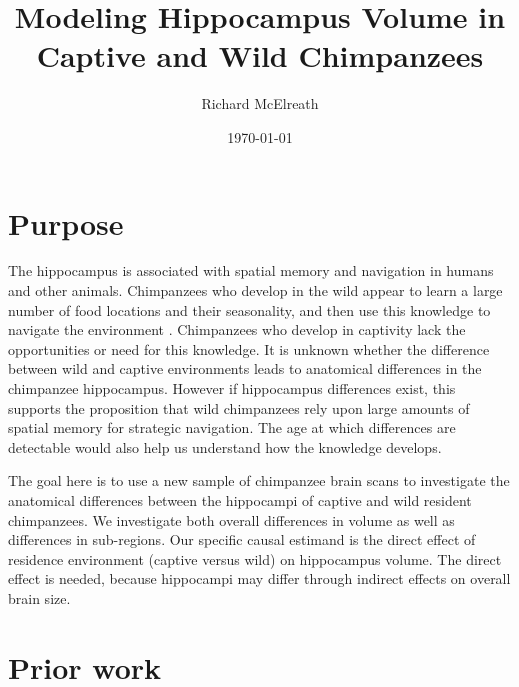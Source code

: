 \documentclass[reqno ,11pt]{amsart}
\begin{document}
\title[Hippocampus Volume]{\large Modeling Hippocampus Volume in Captive and Wild Chimpanzees}
\author{Richard McElreath}
\address{Department of Human Behavior, Ecology and Culture, Max Planck Institute for Evolutionary Anthropology, Deutscher Platz 6, 04103 Leipzig, Germany}
\date{\today}

\maketitle


\linenumbers
\modulolinenumbers[5]

\section{Purpose}

The hippocampus is associated with spatial memory and navigation in humans \citep{Maguire2000} and other animals. Chimpanzees who develop in the wild appear to learn a large number of food locations and their seasonality, and then use this knowledge to navigate the environment \citep{Janmaat2013}. Chimpanzees who develop in captivity lack the opportunities or need for this knowledge. It is unknown whether the difference between wild and captive environments leads to anatomical differences in the chimpanzee hippocampus. However if hippocampus differences exist, this supports the proposition that wild chimpanzees rely upon large amounts of spatial memory for strategic navigation. The age at which differences are detectable would also help us understand how the knowledge develops.

The goal here is to use a new sample of chimpanzee brain scans to investigate the anatomical differences between the hippocampi of captive and wild resident chimpanzees. We investigate both overall differences in volume as well as differences in sub-regions. Our specific causal estimand is the direct effect of residence environment (captive versus wild) on hippocampus volume. The direct effect is needed, because hippocampi may differ through indirect effects on overall brain size.

\section{Prior work}
\end{document}
